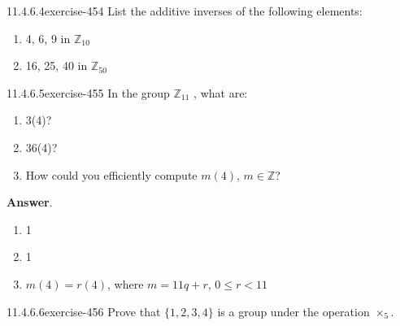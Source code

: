\documentclass[twoside,10pt,]{book}
\numberwithin{equation}{section}
\begin{document}
\begin{divisionsolution}{11.4.6.4}{}{exercise-454}%
\hypertarget{p-4046}{}%
List the additive inverses of the following elements:\leavevmode%
\begin{enumerate}[label=(\alph*)]
\item\hypertarget{li-1837}{}\hypertarget{p-4047}{}%
4, 6, 9 in \(\mathbb{Z}_{10}\)%
\item\hypertarget{li-1838}{}\hypertarget{p-4048}{}%
16, 25, 40 in \(\mathbb{Z}_{50}\)%
\end{enumerate}
%
\end{divisionsolution}%
\begin{divisionsolution}{11.4.6.5}{}{exercise-455}%
\hypertarget{p-4049}{}%
In the group \(\mathbb{Z}_{11}\) , what are:\leavevmode%
\begin{enumerate}[label=(\alph*)]
\item\hypertarget{li-1839}{}\hypertarget{p-4050}{}%
3(4)?%
\item\hypertarget{li-1840}{}\hypertarget{p-4051}{}%
36(4)?%
\item\hypertarget{li-1841}{}\hypertarget{p-4052}{}%
How could you efficiently compute \(m(4)\), \(m \in  \mathbb{Z}\)?%
\end{enumerate}
%
\par\smallskip%
\noindent\textbf{Answer}.\quad%
\hypertarget{p-4053}{}%
\leavevmode%
\begin{multicols}{2}
\begin{enumerate}[label=(\alph*)]
\item\hypertarget{li-1842}{}\hypertarget{p-4054}{}%
1%
\item\hypertarget{li-1843}{}\hypertarget{p-4055}{}%
1%
\item\hypertarget{li-1844}{}\hypertarget{p-4056}{}%
\(m(4) = r(4)\), where \(m = 11 q + r\), \(0 \leq  r < 11\)%
\end{enumerate}
\end{multicols}
%
\end{divisionsolution}%
\begin{divisionsolution}{11.4.6.6}{}{exercise-456}%
\hypertarget{p-4057}{}%
Prove that \(\{1, 2, 3, 4\}\) is a group under the operation \(\times_5 \).%
\end{divisionsolution}%
\end{document}
